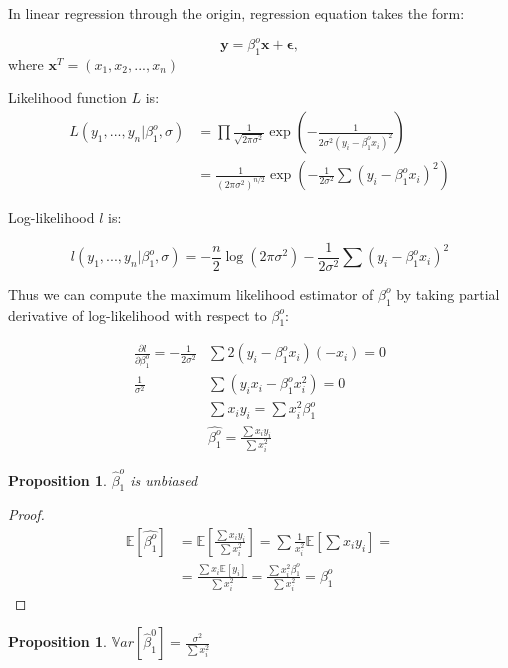 \documentclass[12pt,a4paper,oneside]{book} %
\newtheorem{proposition}[theorem]{Proposition}
\begin{document}
	
	In linear regression through the origin, regression equation takes the form:
	
	\begin{equation}
		\mathbf{y} = \beta_1^o \mathbf{x} + \mathbf{\epsilon},
	\end{equation}
	where $\mathbf{x}^T=(x_1,x_2,...,x_n)$
	
	
	
	Likelihood function $L$ is:
	\begin{align*}
		L(y_1,...,y_n | \beta_1^o, \sigma) &= \prod \frac{1}{\sqrt{2 \pi \sigma^2}} \exp(-\frac{1}{2\sigma^2 (y_i-\beta_1^o x_i)^2}) \\
		&= \frac{1}{(2\pi \sigma^2)^{n/2}}\exp(-\frac{1}{2\sigma^2} \sum (y_i-\beta_1^o x_i)^2)
	\end{align*}

	Log-likelihood $l$ is:

\[
	l(y_1,...,y_n | \beta_1^o, \sigma)=-\frac{n}{2}\log(2\pi \sigma^2)-\frac{1}{2 \sigma^2} \sum (y_i - \beta_1^o x_i)^2
\]

Thus we can compute the maximum likelihood estimator of $\beta_1^o$ by taking partial derivative of log-likelihood with respect to $\beta_1^o$:

\begin{align*}
	\frac{\partial l}{\partial \beta_1^o} = - \frac{1}{2 \sigma^2} & \sum 2(y_i-\beta_1^o x_i)(-x_i)=0 \\
	\frac{1}{\sigma^2}& \sum (y_i x_i - \beta_1^o x_i ^2) = 0 \\
	& \sum x_i y_i =  \sum  x_i^2 \beta_1^o \\
	& \hat{\beta_1^o} = \frac{\sum x_i y_i}{\sum x_i^2}
\end{align*}


	\begin{proposition}
		$\hat{\beta}_1^o$ is unbiased
	\end{proposition}

	\begin{proof}
		\begin{align*}
			\mathbb{E} [\hat{\beta_1^o}] &= \mathbb{E} [\frac{\sum x_i y_i}{\sum x_i^2}] = \sum \frac{1}{x_i^2} \mathbb{E}[\sum x_i y_i] = \\
			&= \frac{\sum x_i\mathbb{E}[y_i]}{\sum x_i^2} = \frac{\sum x_i^2 \beta_1^o}{\sum x_i^2} = \beta_1^o 
		\end{align*}
	\end{proof}


	\begin{proposition} \label{prop:variance_slop_no_intercept}
		$\mathbb{V}ar[\hat{\beta}_1^0] = \frac{\sigma^2}{\sum x_i^2}$
	\end{proposition}
\end{document}
